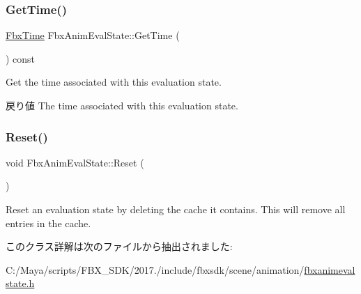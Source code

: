 \subsubsection{\texorpdfstring{Get\+Time()}{GetTime()}}
{\footnotesize\ttfamily \hyperlink{class_fbx_time}{Fbx\+Time} Fbx\+Anim\+Eval\+State\+::\+Get\+Time (\begin{DoxyParamCaption}{ }\end{DoxyParamCaption}) const}

Get the time associated with this evaluation state. \begin{DoxyReturn}{戻り値}
The time associated with this evaluation state. 
\end{DoxyReturn}
\mbox{\label{class_fbx_anim_eval_state_a34be9a999fc7dfa426307b4778a50344}} 
\subsubsection{\texorpdfstring{Reset()}{Reset()}}
{\footnotesize\ttfamily void Fbx\+Anim\+Eval\+State\+::\+Reset (\begin{DoxyParamCaption}{ }\end{DoxyParamCaption})}

Reset an evaluation state by deleting the cache it contains. This will remove all entries in the cache. 

このクラス詳解は次のファイルから抽出されました\+:\begin{DoxyCompactItemize}
\item 
C\+:/\+Maya/scripts/\+F\+B\+X\+\_\+\+S\+D\+K/2017./include/fbxsdk/scene/animation/\hyperlink{fbxanimevalstate_8h}{fbxanimevalstate.\+h}\end{DoxyCompactItemize}
